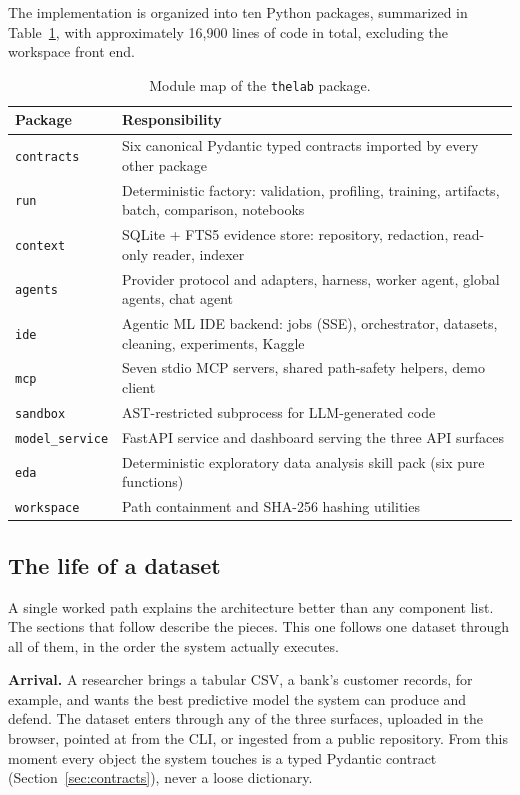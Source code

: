 The implementation is organized into ten Python packages, summarized in Table~\ref{tab:modules}, with approximately 16{,}900 lines of code in total, excluding the workspace front end.

\begin{table}[H]
\centering
\caption{Module map of the \texttt{thelab} package.}
\label{tab:modules}
\small
\begin{tabular}{p{3.2cm}p{11.2cm}}
\toprule
\textbf{Package} & \textbf{Responsibility} \\
\midrule
\texttt{contracts} & Six canonical Pydantic typed contracts imported by every other package \\
\texttt{run} & Deterministic factory: validation, profiling, training, artifacts, batch, comparison, notebooks \\
\texttt{context} & SQLite + FTS5 evidence store: repository, redaction, read-only reader, indexer \\
\texttt{agents} & Provider protocol and adapters, harness, worker agent, global agents, chat agent \\
\texttt{ide} & Agentic ML IDE backend: jobs (SSE), orchestrator, datasets, cleaning, experiments, Kaggle \\
\texttt{mcp} & Seven stdio MCP servers, shared path-safety helpers, demo client \\
\texttt{sandbox} & AST-restricted subprocess for LLM-generated code \\
\texttt{model\_service} & FastAPI service and dashboard serving the three API surfaces \\
\texttt{eda} & Deterministic exploratory data analysis skill pack (six pure functions) \\
\texttt{workspace} & Path containment and SHA-256 hashing utilities \\
\bottomrule
\end{tabular}
\end{table}

\subsection{The life of a dataset}
\label{sec:lifeof}

A single worked path explains the architecture better than any component list. The sections that follow describe the pieces. This one follows one dataset through all of them, in the order the system actually executes.

\textbf{Arrival.} A researcher brings a tabular CSV, a bank's customer records, for example, and wants the best predictive model the system can produce and defend. The dataset enters through any of the three surfaces, uploaded in the browser, pointed at from the CLI, or ingested from a public repository. From this moment every object the system touches is a typed Pydantic contract (Section~\ref{sec:contracts}), never a loose dictionary.

